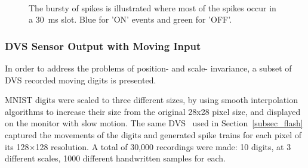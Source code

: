 \documentclass[journal]{journal}
\begin{document}
	\begin{figure}[b!]
		\centering
		\\
		
		\caption{The bursty of spikes is illustrated where most of the spikes occur in a 30~ms slot. Blue for 'ON' events and green for 'OFF'.}
		\label{fig:flash}
	\end{figure}
	\subsubsection{DVS Sensor Output with Moving Input}
	In order to address the problems of position- and scale- invariance, a subset of DVS recorded moving digits is presented.
	
	MNIST digits were scaled to three different sizes, by using smooth interpolation algorithms to increase their size from the original 28x28 pixel size, and displayed on the monitor with slow motion. 
	The same DVS~\cite{serrano2013128} used in Section~\ref{subsec_flash} captured the movements of the digits and generated spike trains for each pixel of its 128$\times$128 resolution.
	A total of 30,000 recordings were made: 10 digits, at 3 different scales, 1000 different handwritten samples for each.
\end{document}
